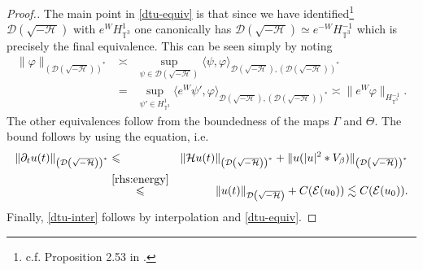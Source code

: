 \begin{proof}[Proof.]
  The main point in \eqref{dtu-equiv} is that since we have
  identified\footnote{c.f. Proposition 2.53 in {\cite{GUZ20}}. } $\mathcal{D}
  \left( \sqrt{- \mathcal{H}} \right)$ with $e^W H_{\mathbb{T}^3}^1$ one
  canonically has $\mathcal{D} \left( \sqrt{- \mathcal{H}} \right)  \simeq
  e^{- W} H_{\mathbb{T}^3}^{- 1}$ which is precisely the final equivalence.
  This can be seen simply by noting
  \begin{eqnarray*}
    \| \varphi \|_{\left( \mathcal{D} \left( \sqrt{- \mathcal{H}} \right)
    \right)^{\ast}} & \asymp & \underset{\psi \in \mathcal{D} \left( \sqrt{-
    \mathcal{H}} \right)}{\sup} {\langle \psi, \varphi \rangle_{\mathcal{D}
    \left( \sqrt{- \mathcal{H}} \right), \left( \mathcal{D} \left( \sqrt{-
    \mathcal{H}} \right) \right)^{\ast}}} \\
    & = & \underset{\psi' \in H_{\mathbb{T}^3}^1}{\sup} {\langle e^W \psi',
    \varphi \rangle_{\mathcal{D} \left( \sqrt{- \mathcal{H}} \right), \left(
    \mathcal{D} \left( \sqrt{- \mathcal{H}} \right) \right)^{\ast}}}  \asymp
    \| e^W \varphi \|_{H_{\mathbb{T}^3}^{- 1}}.
  \end{eqnarray*}
  The other equivalences follow from the boundedness of the maps $\Gamma$ and
  $\Theta$. The bound follows by using the equation, i.e.
  \begin{eqnarray*}
    \| \partial_t u (t) \|_{\left( \mathcal{D} \left( \sqrt{- \mathcal{H}}
    \right) \right)^{\ast}} & \leqslant & \| \mathcal{H} u (t) \|_{\left(
    \mathcal{D} \left( \sqrt{- \mathcal{H}} \right) \right)^{\ast}} + \| u (|
    u |^2 \ast V_{\beta}) \|_{\left( \mathcal{D} \left( \sqrt{- \mathcal{H}}
    \right) \right)^{\ast}}\\
    & \overset{\eqref{rhs:energy}}{\leqslant} & \| u (t) \|_{\mathcal{D}
    \left( \sqrt{- \mathcal{H}} \right)} + C (\mathcal{E} (u_0)) \lesssim C
    (\mathcal{E} (u_0)) .
  \end{eqnarray*}
  Finally, \eqref{dtu-inter} follows by interpolation and \eqref{dtu-equiv}.
\end{proof}

